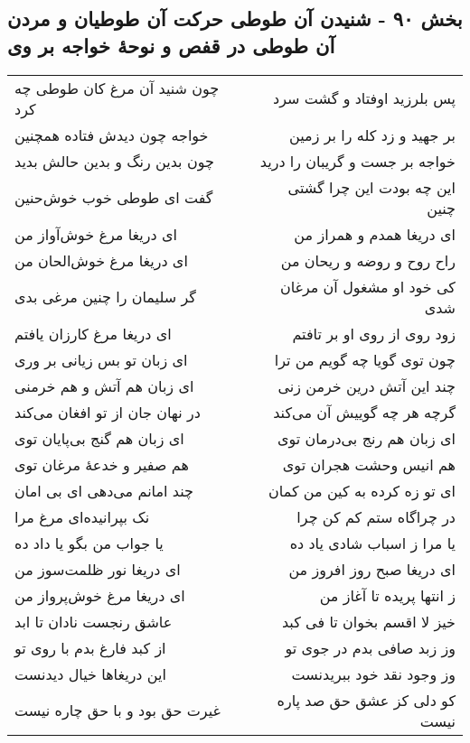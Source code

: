 \begin{center}
\section*{بخش ۹۰ - شنیدن آن طوطی حرکت آن طوطیان و مردن آن طوطی در قفص و نوحهٔ خواجه بر وی}
\label{sec:sh090}
\begin{longtable}{l p{0.5cm} r}
چون شنید آن مرغ کان طوطی چه کرد
&&
پس بلرزید اوفتاد و گشت سرد
\\
خواجه چون دیدش فتاده همچنین
&&
بر جهید و زد کله را بر زمین
\\
چون بدین رنگ و بدین حالش بدید
&&
خواجه بر جست و گریبان را درید
\\
گفت ای طوطی خوب خوش‌حنین
&&
این چه بودت این چرا گشتی چنین
\\
ای دریغا مرغ خوش‌آواز من
&&
ای دریغا همدم و همراز من
\\
ای دریغا مرغ خوش‌الحان من
&&
راح روح و روضه و ریحان من
\\
گر سلیمان را چنین مرغی بدی
&&
کی خود او مشغول آن مرغان شدی
\\
ای دریغا مرغ کارزان یافتم
&&
زود روی از روی او بر تافتم
\\
ای زبان تو بس زیانی بر وری
&&
چون توی گویا چه گویم من ترا
\\
ای زبان هم آتش و هم خرمنی
&&
چند این آتش درین خرمن زنی
\\
در نهان جان از تو افغان می‌کند
&&
گرچه هر چه گوییش آن می‌کند
\\
ای زبان هم گنج بی‌پایان توی
&&
ای زبان هم رنج بی‌درمان توی
\\
هم صفیر و خدعهٔ مرغان توی
&&
هم انیس وحشت هجران توی
\\
چند امانم می‌دهی ای بی امان
&&
ای تو زه کرده به کین من کمان
\\
نک بپرانیده‌ای مرغ مرا
&&
در چراگاه ستم کم کن چرا
\\
یا جواب من بگو یا داد ده
&&
یا مرا ز اسباب شادی یاد ده
\\
ای دریغا نور ظلمت‌سوز من
&&
ای دریغا صبح روز افروز من
\\
ای دریغا مرغ خوش‌پرواز من
&&
ز انتها پریده تا آغاز من
\\
عاشق رنجست نادان تا ابد
&&
خیز لا اقسم بخوان تا فی کبد
\\
از کبد فارغ بدم با روی تو
&&
وز زبد صافی بدم در جوی تو
\\
این دریغاها خیال دیدنست
&&
وز وجود نقد خود ببریدنست
\\
غیرت حق بود و با حق چاره نیست
&&
کو دلی کز عشق حق صد پاره نیست
\\

\end{longtable}
\end{center}
